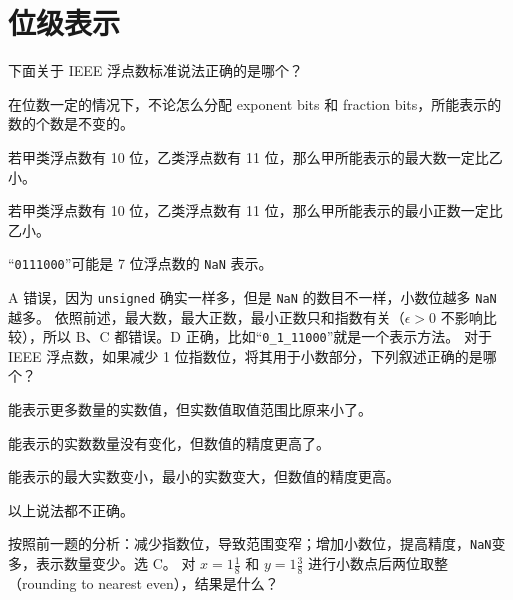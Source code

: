 \chapter{位级表示}
    \begin{problems}
        \pro 下面关于 IEEE 浮点数标准说法正确的是哪个？
		\begin{choices}
			\item 在位数一定的情况下，不论怎么分配 exponent bits 和 fraction bits，所能表示的数的个数是不变的。
			\item 若甲类浮点数有 10 位，乙类浮点数有 11 位，那么甲所能表示的最大数一定比乙小。
			\item 若甲类浮点数有 10 位，乙类浮点数有 11 位，那么甲所能表示的最小正数一定比乙小。
		    \item “\texttt{0111000}”可能是 7 位浮点数的 \texttt{NaN} 表示。
		\end{choices}
		\sol A 错误，因为 \texttt{unsigned} 确实一样多，但是 \texttt{NaN} 的数目不一样，小数位越多 \texttt{NaN} 越多。 依照前述，最大数，最大正数，最小正数只和指数有关（$\epsilon>0$ 不影响比较），所以 B、C 都错误。D 正确，比如“\texttt{0\_1\_11000}”就是一个表示方法。
        \pro 对于 IEEE 浮点数，如果减少 1 位指数位，将其用于小数部分，下列叙述正确的是哪个？
		\begin{choices}
			\item 能表示更多数量的实数值，但实数值取值范围比原来小了。
			\item 能表示的实数数量没有变化，但数值的精度更高了。
			\item 能表示的最大实数变小，最小的实数变大，但数值的精度更高。
			\item 以上说法都不正确。
        \end{choices}
		\sol 按照前一题的分析：减少指数位，导致范围变窄；增加小数位，提高精度，\texttt{NaN}变多，表示数量变少。选 C。
        \pro 对 $x=1 \frac{1}{8}$ 和 $y=1 \frac{3}{8}$ 进行小数点后两位取整（rounding to nearest even），结果是什么？
    \end{problems}